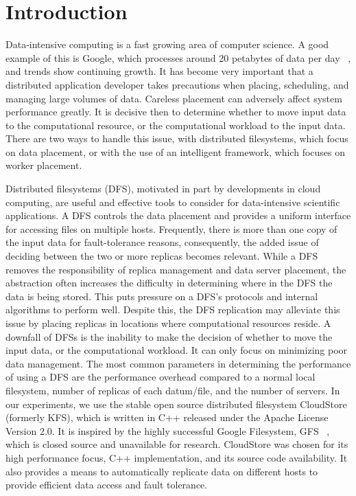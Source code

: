 \documentclass{rspublic}
\begin{document}
\section{Introduction} Data-intensive computing is a fast growing area
of computer science. A good example of this is Google, which processes
around 20 petabytes of data per day ~\citep{google}, and trends show
continuing growth. It has become very important that a distributed
application developer takes precautions when placing, scheduling, and
managing large volumes of data. Careless placement can adversely affect
system performance greatly. It is decisive then to determine whether to
move input data to the computational resource, or the computational
workload to the input data. There are two ways to handle this issue,
with distributed filesystems, which focus on data placement, or with the
use of an intelligent framework, which focuses on worker placement. 

Distributed filesystems (DFS), motivated in part by developments in
cloud computing, are useful and effective tools to consider for
data-intensive scientific applications. A DFS controls the data
placement and provides a uniform interface for accessing files on
multiple hosts. Frequently, there is more than one copy of the input
data for fault-tolerance reasons, consequently, the added issue of
deciding between the two or more replicas becomes relevant. While a DFS
removes the responsibility of replica management and data server
placement, the abstraction often increases the difficulty in determining
where in the DFS the data is being stored. This puts pressure on a
DFS's protocols and internal algorithms to perform well. Despite this,
the DFS replication may alleviate this issue by placing replicas in
locations where computational resources reside. A downfall of DFSs is
the inability to make the decision of whether to move the input data, or
the computational workload. It can only focus on minimizing poor data
management. The most common parameters in determining the performance of
using a DFS are the performance overhead compared to a normal local
filesystem, number of replicas of each datum/file, and the number of
servers. In our experiments, we use the stable open source distributed
filesystem CloudStore (formerly KFS), which is written in C++ released
under the Apache License Version 2.0. It is inspired by the highly
successful Google Filesystem, GFS ~\citep{cloudstore_web}, which is
closed source and unavailable for research. CloudStore was chosen for
its high performance focus, C++ implementation, and its source code
availability. It also provides a means to automatically replicate data
on different hosts to provide efficient data access and fault tolerance. 
\end{document}
